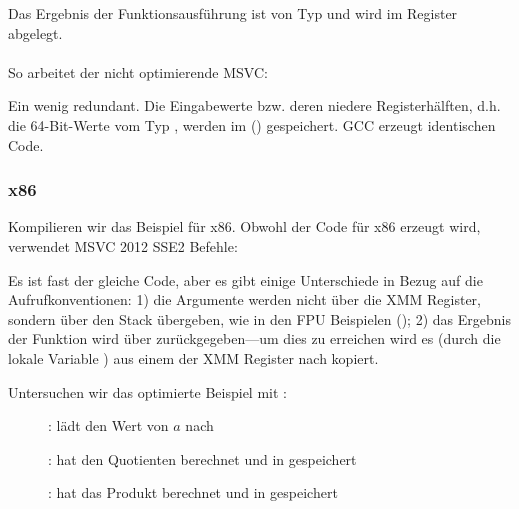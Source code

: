 Das Ergebnis der Funktionsausführung ist von Typ \Tdouble und wird im  Register abgelegt.\\\\
So arbeitet der nicht optimierende MSVC:



Ein wenig redundant. Die Eingabewerte bzw. deren niedere Registerhälften, d.h. die 64-Bit-Werte vom Typ \Tdouble, werden
im () gespeichert.
GCC erzeugt identischen Code.

\subsubsection{x86}
Kompilieren wir das Beispiel für x86. Obwohl der Code für x86 erzeugt wird, verwendet MSVC 2012 SSE2 Befehle:




Es ist fast der gleiche Code, aber es gibt einige Unterschiede in Bezug auf die Aufrufkonventionen:
1) die Argumente werden nicht über die XMM Register, sondern über den Stack übergeben, wie in den FPU Beispielen
();
2) das Ergebnis der Funktion wird über  zurückgegeben---um dies zu erreichen wird es (durch die lokale Variable
) aus einem der XMM Register nach  kopiert.

\clearpage
Untersuchen wir das optimierte Beispiel mit \olly:

\begin{figure}[H]
\centering
{}
\caption{\olly:  lädt den Wert von $a$ nach }
\label{fig:FPU_SIMD_simple_olly1}
\end{figure}

\clearpage
\begin{figure}[H]
\centering
{}
\caption{\olly:  hat den Quotienten berechnet und in  gespeichert} 
\label{fig:FPU_SIMD_simple_olly2}
\end{figure}

\clearpage
\begin{figure}[H]
\centering
{}
\caption{\olly:  hat das Produkt berechnet und in  gespeichert}
\label{fig:FPU_SIMD_simple_olly3}
\end{figure}

